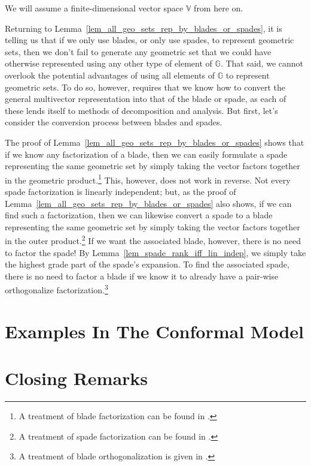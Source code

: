 \documentclass{birkjour}
\theoremstyle{definition}
\theoremstyle{remark}
\numberwithin{equation}{section}
\newcommand{\G}{\mathbb{G}}
\newcommand{\V}{\mathbb{V}}
\begin{document}
We will assume a finite-dimensional vector space $\V$ from here on.

Returning to Lemma~\ref{lem_all_geo_sets_rep_by_blades_or_spades}, it is telling us that if we only use blades, or only use spades, to represent geometric sets,
then we don't fail to generate any geometric set
that we could have otherwise represented using any other type of element of $\G$.  That said, we cannot overlook the potential advantages
of using all elements of $\G$ to represent geometric sets.  To do so, however, requires that we know how to convert the general multivector
representation into that of the blade or spade, as each of these lends itself to methods of decomposition and analysis.  But first, let's
consider the conversion process between blades and spades.

The proof of Lemma~\ref{lem_all_geo_sets_rep_by_blades_or_spades} shows that if we know
any factorization of a blade, then we can easily formulate a spade representing the same geometric set
by simply taking the vector factors together in the geometric product.\footnote{A treatment of blade factorization can be found in \cite[p. 533]{Dorst07}.}
This, however, does not work in reverse.  Not every spade factorization is linearly independent; but,
as the proof of Lemma~\ref{lem_all_geo_sets_rep_by_blades_or_spades} also shows, if we can find such a factorization, then we can likewise convert a spade
to a blade representing the same geometric set by simply taking the vector factors together in the outer product.\footnote{A treatment of spade factorization can be found in \cite[p. 107]{Perwass09}.}
If we want the associated blade, however, there is no need to factor the spade!
By Lemma~\ref{lem_spade_rank_iff_lin_indep}, we simply take the highest grade part of the spade's expansion.
To find the associated spade, there is no need to factor a blade if we know it to already have a pair-wise orthogonalize factorization.\footnote{A treatment of blade orthogonalization is given in \cite[p. 88]{Doran03}.}



\section{Examples In The Conformal Model}

\section{Closing Remarks}
\end{document}
